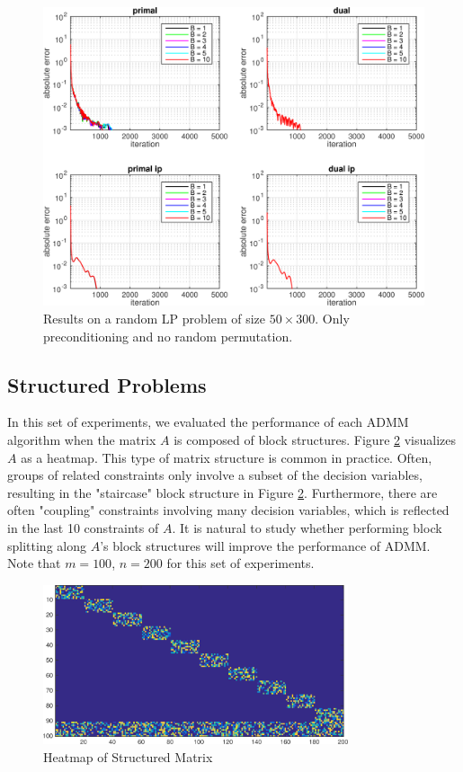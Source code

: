 \documentclass{article}
\begin{document}
\begin{figure}[h]
	\includegraphics[width=\textwidth]{../figures/precond_norndperm.png}
	\caption{Results on a random LP problem of size $50 \times 300$. Only preconditioning and no random permutation.}
	\label{fig:p_nor}
\end{figure}

\subsection*{Structured Problems}
In this set of experiments, we evaluated the performance of each ADMM algorithm when the matrix $A$ is composed of block structures. Figure \ref{fig:struct_prob} visualizes $A$ as a heatmap. This type of matrix structure is common in practice. Often, groups of related constraints only involve a subset of the decision variables, resulting in the "staircase" block structure in Figure \ref{fig:struct_prob}. Furthermore, there are often "coupling" constraints involving many decision variables, which is reflected in the last 10 constraints of $A$. It is natural to study whether performing block splitting along $A$'s block structures will improve the performance of ADMM. Note that $m=100$, $n=200$ for this set of experiments. 

\begin{figure}[h]
	\centering
	\includegraphics[width=0.8\textwidth]{../figures/struct_prob.png}
	\caption{Heatmap of Structured Matrix}
	\label{fig:struct_prob}
\end{figure}
\end{document}
